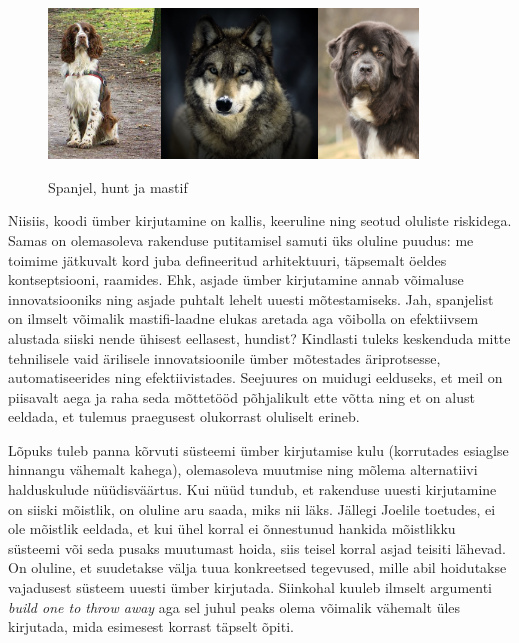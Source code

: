 \documentclass{article}
\begin{document}
\begin{figure}[htp]
	\begin{center}
		\includegraphics[height=4cm]{spaniel.jpg}\includegraphics[height=4cm]{wolf.jpg}\includegraphics[height=4cm]{mastiff.jpg}
		\caption{Spanjel, hunt ja mastif}
	\end{center}
\end{figure}

Niisiis, koodi ümber kirjutamine on kallis, keeruline ning seotud oluliste riskidega. Samas on olemasoleva rakenduse putitamisel samuti üks oluline puudus: me toimime jätkuvalt kord juba defineeritud arhitektuuri, täpsemalt öeldes kontseptsiooni, raamides. Ehk, asjade ümber kirjutamine annab võimaluse innovatsiooniks ning asjade puhtalt lehelt uuesti mõtestamiseks. Jah, spanjelist on ilmselt võimalik mastifi-laadne elukas aretada aga võibolla on efektiivsem alustada siiski nende ühisest eellasest, hundist? Kindlasti tuleks keskenduda mitte tehnilisele vaid ärilisele innovatsioonile ümber mõtestades äriprotsesse, automatiseerides ning efektiivistades. Seejuures on muidugi eelduseks, et meil on piisavalt aega ja raha seda mõttetööd põhjalikult ette võtta ning et on alust eeldada, et tulemus praegusest olukorrast oluliselt erineb.

Lõpuks tuleb panna kõrvuti süsteemi ümber kirjutamise kulu (korrutades esiaglse hinnangu vähemalt kahega), olemasoleva muutmise ning mõlema alternatiivi halduskulude nüüdisväärtus. Kui nüüd tundub, et rakenduse uuesti kirjutamine on siiski mõistlik, on oluline aru saada, miks nii läks. Jällegi Joelile toetudes, ei ole mõistlik eeldada, et kui ühel korral ei õnnestunud hankida mõistlikku süsteemi või seda pusaks muutumast hoida, siis teisel korral asjad teisiti lähevad. On oluline, et suudetakse välja tuua konkreetsed tegevused, mille abil hoidutakse vajadusest süsteem uuesti ümber kirjutada. Siinkohal kuuleb ilmselt argumenti \emph{build one to throw away} aga sel juhul peaks olema võimalik vähemalt üles kirjutada, mida esimesest korrast täpselt õpiti.
\end{document}
